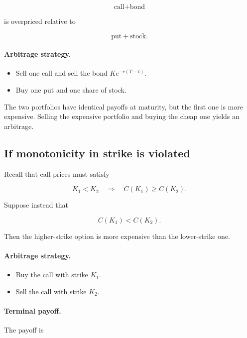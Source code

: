 \documentclass[11pt]{article}
\newcommand{\1}{\mathbf{1}}
\theoremstyle{plain}
\theoremstyle{definition}
\theoremstyle{remark}
\begin{document}
\[
\text{call} + \text{bond}
\]

is overpriced relative to

\[
\text{put} + \text{stock}.
\]

\paragraph{Arbitrage strategy.}

\begin{itemize}[leftmargin=1.4em]
\item Sell one call and sell the bond \(K e^{-r(T-t)}\).
\item Buy one put and one share of stock.
\end{itemize}

The two portfolios have identical payoffs at maturity,
but the first one is more expensive.
Selling the expensive portfolio and buying the cheap one yields an
arbitrage.

\subsection{If monotonicity in strike is violated}

Recall that call prices must satisfy

\[
K_1 < K_2
\quad\Rightarrow\quad
C(K_1) \ge C(K_2).
\]

Suppose instead that

\[
C(K_1) < C(K_2).
\]

Then the higher-strike option is more expensive than the lower-strike one.

\paragraph{Arbitrage strategy.}

\begin{itemize}[leftmargin=1.4em]
\item Buy the call with strike \(K_1\).
\item Sell the call with strike \(K_2\).
\end{itemize}

\paragraph{Terminal payoff.}

The payoff is
\end{document}
